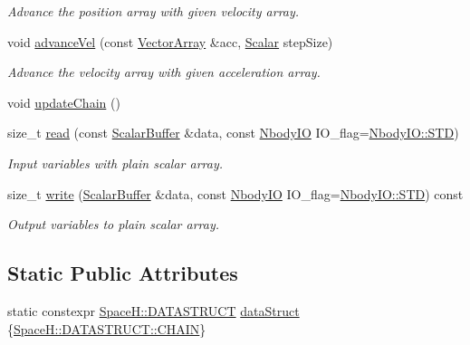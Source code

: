 \begin{DoxyCompactItemize}
\begin{DoxyCompactList}\small\item\em Advance the position array with given velocity array. \end{DoxyCompactList}\item 
void \mbox{\hyperlink{class_space_h_1_1_vel_indep_chain_particles_a628718ae8e943e403adc9864be81d306}{advance\+Vel}} (const \mbox{\hyperlink{class_space_h_1_1_vel_indep_particles_aa9983058940249df8b00fa800e8cbad2}{Vector\+Array}} \&acc, \mbox{\hyperlink{class_space_h_1_1_vel_indep_particles_aeb47d8131b30ed790320ff634f0d6af1}{Scalar}} step\+Size)
\begin{DoxyCompactList}\small\item\em Advance the velocity array with given acceleration array. \end{DoxyCompactList}\item 
void \mbox{\hyperlink{class_space_h_1_1_vel_indep_chain_particles_a06d1ed1c4eaef6229aabf5ad3f2de45d}{update\+Chain}} ()
\item 
size\+\_\+t \mbox{\hyperlink{class_space_h_1_1_vel_indep_chain_particles_a60778581313c992696314625eb2b30cf}{read}} (const \mbox{\hyperlink{class_space_h_1_1_vel_indep_particles_abca40159a816385790d5a6fd19c1dc6d}{Scalar\+Buffer}} \&data, const \mbox{\hyperlink{namespace_space_h_a296a8bae763a754564bfdce216e31b59}{Nbody\+IO}} I\+O\+\_\+flag=\mbox{\hyperlink{namespace_space_h_a296a8bae763a754564bfdce216e31b59ac6ce23be5d350ce18a665427d2d950f7}{Nbody\+I\+O\+::\+S\+TD}})
\begin{DoxyCompactList}\small\item\em Input variables with plain scalar array. \end{DoxyCompactList}\item 
size\+\_\+t \mbox{\hyperlink{class_space_h_1_1_vel_indep_chain_particles_aa67fcd1ff597b37aa49020eec198fd0c}{write}} (\mbox{\hyperlink{class_space_h_1_1_vel_indep_particles_abca40159a816385790d5a6fd19c1dc6d}{Scalar\+Buffer}} \&data, const \mbox{\hyperlink{namespace_space_h_a296a8bae763a754564bfdce216e31b59}{Nbody\+IO}} I\+O\+\_\+flag=\mbox{\hyperlink{namespace_space_h_a296a8bae763a754564bfdce216e31b59ac6ce23be5d350ce18a665427d2d950f7}{Nbody\+I\+O\+::\+S\+TD}}) const
\begin{DoxyCompactList}\small\item\em Output variables to plain scalar array. \end{DoxyCompactList}\end{DoxyCompactItemize}
\subsection*{Static Public Attributes}
\begin{DoxyCompactItemize}
\item 
static constexpr \mbox{\hyperlink{namespace_space_h_a4782f089179a3c269891f02482b072df}{Space\+H\+::\+D\+A\+T\+A\+S\+T\+R\+U\+CT}} \mbox{\hyperlink{class_space_h_1_1_vel_indep_chain_particles_acf17d83713bb3f519dc1323418343375}{data\+Struct}} \{\mbox{\hyperlink{namespace_space_h_a4782f089179a3c269891f02482b072dfa014d2cf3cdc3af6f4f92c09190860e33}{Space\+H\+::\+D\+A\+T\+A\+S\+T\+R\+U\+C\+T\+::\+C\+H\+A\+IN}}\}
\end{DoxyCompactItemize}
